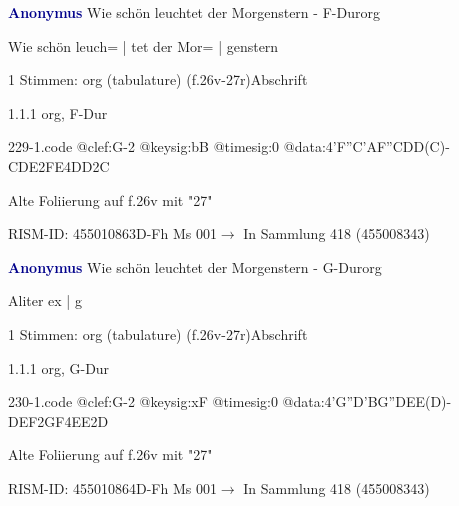 \documentclass[twocolumn, 12pt]{book}
\begin{document}
\par \vspace{16pt} \textcolor{darkblue}{\textbf{Anonymus  }}\hfillplus{\textbf{[229]}}\newline Wie schön leuchtet der Morgenstern - F-Dur\newline org
\par \begin{itshape}[f.26v, at left:] Wie schön leuch= | tet der Mor= | genstern\end{itshape} 
\par \textcolor{darkblue}{}  1 Stimmen: org (tabulature)  (f.26v-27r)\newline Abschrift
\par 1.1.1  org, F-Dur  
\begin{filecontents*}{229-1.code}
@clef:G-2
@keysig:bB
@timesig:0
@data:4'F''C'AF''CDD(C)-CDE2FE4DD2C
\end{filecontents*}
\newline %
\par Alte Foliierung auf f.26v mit "27"
\par RISM-ID: 455010863\newline D-Fh  Ms 001\newline $\rightarrow$ In Sammlung 418 (455008343)
      
\par \vspace{16pt} \textcolor{darkblue}{\textbf{Anonymus  }}\hfillplus{\textbf{[230]}}\newline Wie schön leuchtet der Morgenstern - G-Dur\newline org
\par \begin{itshape}[f.26v, at left:] Aliter ex | g\end{itshape} 
\par \textcolor{darkblue}{}  1 Stimmen: org (tabulature)  (f.26v-27r)\newline Abschrift
\par 1.1.1  org, G-Dur  
\begin{filecontents*}{230-1.code}
@clef:G-2
@keysig:xF
@timesig:0
@data:4'G''D'BG''DEE(D)-DEF2GF4EE2D
\end{filecontents*}
\newline %
\par Alte Foliierung auf f.26v mit "27"
\par RISM-ID: 455010864\newline D-Fh  Ms 001\newline $\rightarrow$ In Sammlung 418 (455008343)
      
\end{document}

